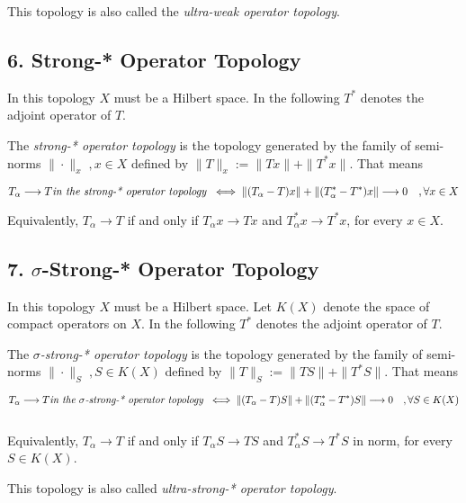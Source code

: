 \documentclass[12pt]{article}
\begin{document}
This topology is also called the \emph{ultra-weak operator topology}.


\subsection{6. Strong-* Operator Topology}
In this topology $X$ must be a Hilbert space. In the following $T^*$ denotes the adjoint operator of $T$.

The \emph{strong-* operator topology} is the topology generated by the family of semi-norms $\|
 \cdot \|_{x}\;, x \in X$ defined by $\|T \|_{x} := \|Tx \|+\|T^*x\|$. That means

\begin{displaymath}
T_{\alpha} \longrightarrow T \text{\emph{in the strong-* operator topology}}\;\; \Longleftrightarrow\; \|(T_{\alpha}-
 T )x\|+\|(T_{\alpha}^*-
 T^* )x\| \longrightarrow 0 \quad, \forall x \in X
\end{displaymath}

Equivalently, $T_{\alpha} \longrightarrow T$ if and only if $T_{\alpha}x \longrightarrow Tx$ and $T_{\alpha}^*x \longrightarrow T^*x$, for every $x \in X$.

\subsection{7. $\sigma$-Strong-* Operator Topology}
In this topology $X$ must be a Hilbert space. Let $K(X)$ denote the space of compact operators on $X$. In the following $T^*$ denotes the adjoint operator of $T$.

The \emph{$\sigma$-strong-* operator topology} is the topology generated by the family of semi-norms $\|
 \cdot \|_S\;, S \in K(X)$ defined by $\|T \|_S := \|TS \|+\|T^*S\|$. That means

\begin{displaymath}
T_{\alpha} \longrightarrow T \text{\emph{in the $\sigma$-strong-* operator topology}}\;\; \Longleftrightarrow\; \|(T_{\alpha}-
 T)S\|+\|(T_{\alpha}^*-
 T^*)S\| \longrightarrow 0 \quad, \forall S \in K(X)
\end{displaymath}

$\,$

Equivalently, $T_{\alpha} \longrightarrow T$ if and only if $T_{\alpha}S \longrightarrow TS$ and $T_{\alpha}^*S \longrightarrow T^*S$ in norm, for every $S \in K(X)$.

This topology is also called \emph{ultra-strong-* operator topology}.
\end{document}
